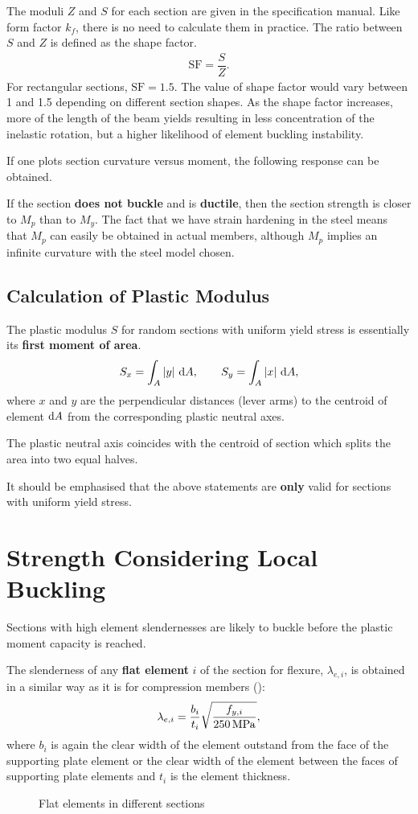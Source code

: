 The moduli $Z$ and $S$ for each section are given in the specification manual. Like form factor $k_f$, there is no need to calculate them in practice. The ratio between $S$ and $Z$ is defined as the shape factor.
\begin{gather*}
\mathrm{SF}=\dfrac{S}{Z}.
\end{gather*}
For rectangular sections, $\mathrm{SF}=1.5$. The value of shape factor would vary between \num{1} and \num{1.5} depending on different section shapes. As the shape factor increases, more of the length of the beam yields resulting in less concentration of the inelastic rotation, but a higher likelihood of element buckling instability.

If one plots section curvature versus moment, the following response can be obtained.
\begin{figure}[H]
\centering

\end{figure}
If the section \textbf{does not buckle} and is \textbf{ductile}, then the section strength is closer to $M_p$ than to $M_y$. The fact that we have strain hardening in the steel means that $M_p$ can easily be obtained in actual members, although $M_p$ implies an infinite curvature with the steel model chosen.
\subsection{Calculation of Plastic Modulus}
The plastic modulus $S$ for random sections with uniform yield stress is essentially its \textbf{first moment of area}.
\begin{gather*}
S_x=\int_A|y|~\mathrm{d}A,\qquad
S_y=\int_A|x|~\mathrm{d}A,
\end{gather*}
where $x$ and $y$ are the perpendicular distances (lever arms) to the centroid of element $\mathrm{d}A$ from the corresponding plastic neutral axes.

The plastic neutral axis coincides with the centroid of section which splits the area into two equal halves.

It should be emphasised that the above statements are \textbf{only} valid for sections with uniform yield stress.
\section{Strength Considering Local Buckling}
Sections with high element slendernesses are likely to buckle before the plastic moment capacity is reached.

The slenderness of any \textbf{flat element} $i$ of the section for flexure, $\lambda_{e,i}$, is obtained in a similar way as it is for compression members ():
\begin{gather*}
\lambda_{e,i}=\dfrac{b_i}{t_i}\sqrt{\dfrac{f_{y,i}}{\SI{250}{\mega\pascal}}},
\end{gather*}
where $b_i$ is again the clear width of the element outstand from the face of the supporting plate element or the clear width of the element between the faces of supporting plate elements and $t_i$ is the element thickness.
\begin{figure}[H]
\centering

\caption{Flat elements in different sections}
\end{figure}

